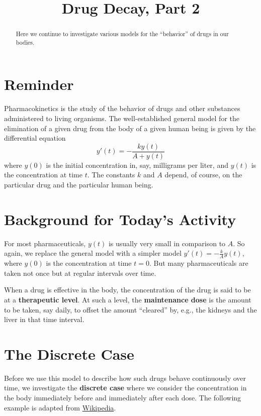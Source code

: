 \documentclass{ximera}
\title{Drug Decay, Part 2}
\begin{document}
\begin{abstract}
Here we continue to investigate various models for the ``behavior'' of drugs in our bodies.  
\end{abstract}
\maketitle

\section{Reminder}
Pharmacokinetics is the study of the behavior of drugs and other substances administered to living organisms.  
The well-established general model for 
the elimination of a given drug from the body of a given human being is given by the differential equation 
$$y'(t)=-\frac{ky(t)}{A+y(t)}$$
where $y(0)$ is the initial concentration in, say, milligrams per liter, and $y(t)$ is the concentration at time $t$.  The constants $k$ and $A$ depend, of course, on the particular drug and the particular human being. 


\section{Background for Today's Activity}
For most pharmaceuticals, $y(t)$ is usually very small in comparison
to $A$.  So again, we replace the general model with a simpler model
$y'(t)=-\frac{k}{A}y(t)$, where $y(0)$ is the concentration at time
$t=0$.  But many pharmaceuticals are taken not once but at regular
intervals over time.

When a drug is effective in the body, the concentration of the drug is
said to be at a \textbf{therapeutic level}.  At such a level, the
\textbf{maintenance dose} is the amount to be taken, say daily, to
offset the amount ``cleared'' by, e.g., the kidneys and the liver in
that time interval.

\section{The Discrete Case}
Before we use this model to describe how such drugs behave
continuously over time, we investigate the \textbf{discrete case}
where we consider the concentration in the body immediately before and
immediately after each dose.  The following example is adapted from
\href{http://en.wikipedia.org/wiki/Loading_dose}{Wikipedia}.
\end{document}
